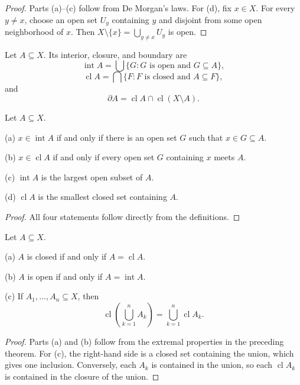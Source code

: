 \begin{proof}
Parts (a)--(c) follow from De Morgan's laws. For (d), fix $x\in X$. For every
$y\neq x$, choose an open set $U_y$ containing $y$ and disjoint from some open
neighborhood of $x$. Then
$X\setminus\{x\}=\bigcup_{y\neq x}U_y$ is open.
\end{proof}

\begin{de}
Let $A\subseteq X$. Its interior, closure, and boundary are
\[
\operatorname{int}A=\bigcup\{G:G\text{ is open and }G\subseteq A\},
\]
\[
\operatorname{cl}A=\bigcap\{F:F\text{ is closed and }A\subseteq F\},
\]
and
\[
\partial A=\operatorname{cl}A\cap\operatorname{cl}(X\setminus A).
\]
\end{de}

\begin{thm}
Let $A\subseteq X$.

(a) $x\in\operatorname{int}A$ if and only if there is an open set $G$ such
that $x\in G\subseteq A$.

(b) $x\in\operatorname{cl}A$ if and only if every open set $G$ containing
$x$ meets $A$.

(c) $\operatorname{int}A$ is the largest open subset of $A$.

(d) $\operatorname{cl}A$ is the smallest closed set containing $A$.
\end{thm}

\begin{proof}
All four statements follow directly from the definitions.
\end{proof}

\begin{thm}
Let $A\subseteq X$.

(a) $A$ is closed if and only if $A=\operatorname{cl}A$.

(b) $A$ is open if and only if $A=\operatorname{int}A$.

(c) If $A_1,\ldots,A_n\subseteq X$, then
\[
\operatorname{cl}\left(\bigcup_{k=1}^nA_k\right)
=\bigcup_{k=1}^n\operatorname{cl}A_k.
\]
\end{thm}

\begin{proof}
Parts (a) and (b) follow from the extremal properties in the preceding
theorem. For (c), the right-hand side is a closed set containing the union,
which gives one inclusion. Conversely, each $A_k$ is contained in the union,
so each $\operatorname{cl}A_k$ is contained in the closure of the union.
\end{proof}

